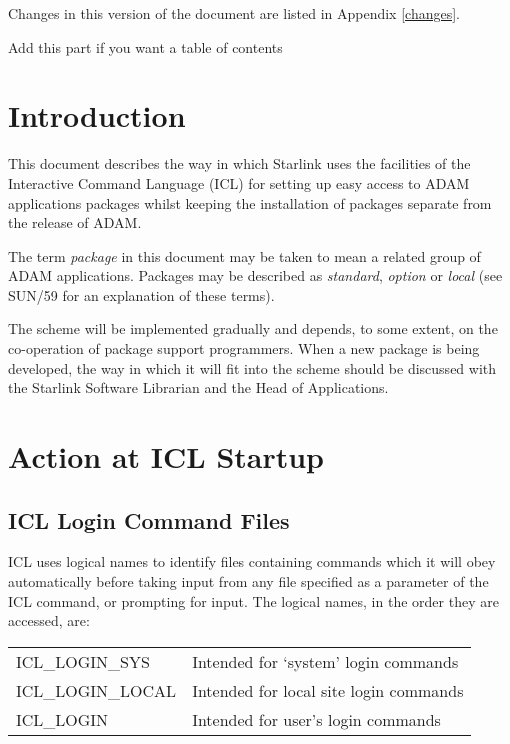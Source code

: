 Changes in this version of the document are listed in Appendix \ref{changes}.
\markright{\stardocname}
\newpage
  Add this part if you want a table of contents
  \setlength{\parskip}{0mm}
  \tableofcontents
  \setlength{\parskip}{\medskipamount}
  \markright{\stardocname}
\newpage
\section{Introduction}
This document describes the way in which Starlink uses the facilities
of the Interactive Command Language (ICL) \cite{icl} for setting up easy 
access to ADAM applications packages whilst keeping the installation of 
packages separate from the release of ADAM.

The term {\em package} in this document may be taken to mean a related group of 
ADAM applications. Packages may be described as {\em standard}, {\em option}
or {\em local}\/ (see SUN/59 \cite{sun59} for an explanation of these terms).

The scheme will be implemented gradually and depends, to some extent, on the
co-operation of package support programmers.
When a new package is being developed, the way in which it will fit into the
scheme should be discussed with the Starlink Software Librarian and the Head 
of Applications.

\section{Action at ICL Startup}
\subsection{ICL Login Command Files}
ICL uses logical names to identify files containing commands which it will 
obey automatically before taking input from any file specified as a parameter 
of the ICL command, or prompting for input.
The logical names, in the order they are accessed, are:

\begin{tabular}{ll}
ICL\_LOGIN\_SYS   & Intended for `system' login commands\\
ICL\_LOGIN\_LOCAL & Intended for local site login commands\\
ICL\_LOGIN      & Intended for user's login commands
\end{tabular}

